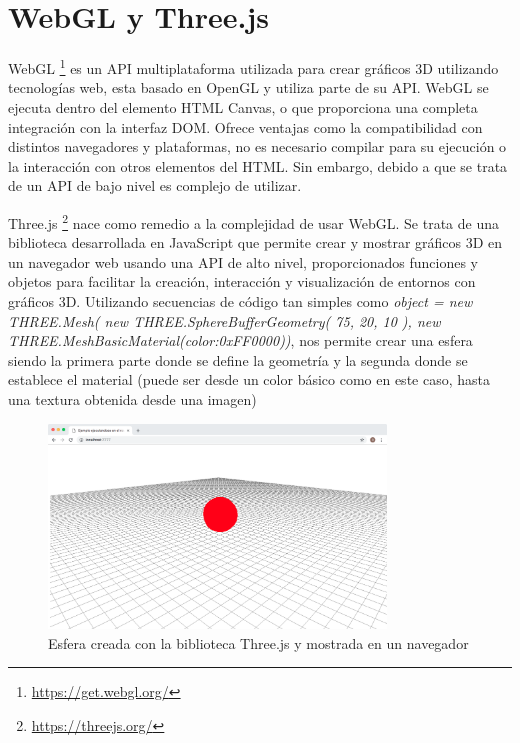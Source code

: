 \section{WebGL y Three.js}
WebGL \footnote{\url{https://get.webgl.org/}}  es un API multiplataforma utilizada para crear gráficos 3D utilizando tecnologías web, esta basado en OpenGL y utiliza parte de su API. WebGL se ejecuta dentro del elemento HTML Canvas, o que proporciona una completa integración con la interfaz DOM. Ofrece ventajas como la compatibilidad con distintos navegadores y plataformas, no es necesario compilar para su ejecución o la interacción con otros elementos del HTML. Sin embargo, debido a que se trata de un API de bajo nivel es complejo de utilizar.

Three.js \footnote{\url{https://threejs.org/}} nace como remedio a la complejidad de usar WebGL. Se trata de una biblioteca desarrollada en JavaScript que permite crear y mostrar gráficos 3D en un navegador web usando una API de alto nivel, proporcionados funciones y objetos para facilitar la creación, interacción y visualización de entornos con gráficos 3D. Utilizando secuencias de código tan simples como \textsl{object = new THREE.Mesh( new THREE.SphereBufferGeometry( 75, 20, 10 ), new THREE.MeshBasicMaterial({color:0xFF0000}))}, nos permite crear una esfera siendo la primera parte donde se define la geometría y la segunda donde se establece el material (puede ser desde un color básico como en este caso, hasta una textura obtenida desde una imagen)

\begin{figure}[H]
  \begin{center}
    \includegraphics[width=0.8\textwidth]{figures/esferathreejs.png}
		\caption{Esfera creada con la biblioteca Three.js y mostrada en un navegador}
		\label{fig.esferathreejs}
		\end{center}
\end{figure}

